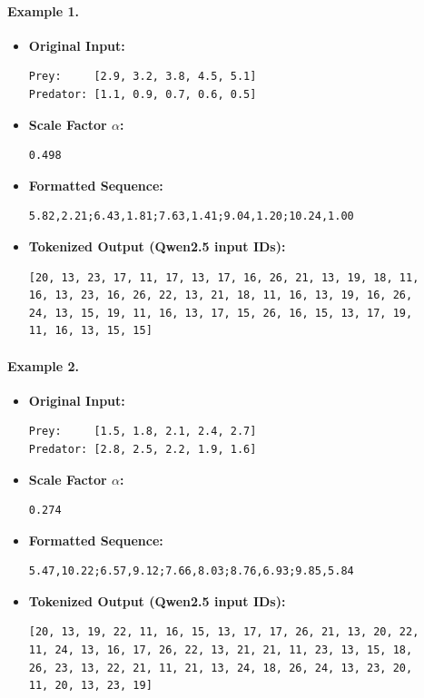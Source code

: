 \documentclass[a4paper,12pt]{article}
\begin{document}
\paragraph{Example 1.}
\begin{itemize}
  \item \textbf{Original Input:}
  \begin{verbatim}
Prey:     [2.9, 3.2, 3.8, 4.5, 5.1]
Predator: [1.1, 0.9, 0.7, 0.6, 0.5]
  \end{verbatim}

  \item \textbf{Scale Factor $\alpha$:}
  \begin{verbatim}
0.498
  \end{verbatim}


  \item \textbf{Formatted Sequence:}
  \begin{verbatim}
5.82,2.21;6.43,1.81;7.63,1.41;9.04,1.20;10.24,1.00
  \end{verbatim}

  \item \textbf{Tokenized Output (Qwen2.5 input IDs):}
  \begin{verbatim}
[20, 13, 23, 17, 11, 17, 13, 17, 16, 26, 21, 13, 19, 18, 11,
16, 13, 23, 16, 26, 22, 13, 21, 18, 11, 16, 13, 19, 16, 26,
24, 13, 15, 19, 11, 16, 13, 17, 15, 26, 16, 15, 13, 17, 19,
11, 16, 13, 15, 15]
  \end{verbatim}
\end{itemize}

\paragraph{Example 2.}
\begin{itemize}
  \item \textbf{Original Input:}
  \begin{verbatim}
Prey:     [1.5, 1.8, 2.1, 2.4, 2.7]
Predator: [2.8, 2.5, 2.2, 1.9, 1.6]
  \end{verbatim}

  \item \textbf{Scale Factor $\alpha$:}
  \begin{verbatim}
0.274
  \end{verbatim}


  \item \textbf{Formatted Sequence:}
  \begin{verbatim}
5.47,10.22;6.57,9.12;7.66,8.03;8.76,6.93;9.85,5.84
  \end{verbatim}

  \item \textbf{Tokenized Output (Qwen2.5 input IDs):}
  \begin{verbatim}
[20, 13, 19, 22, 11, 16, 15, 13, 17, 17, 26, 21, 13, 20, 22,
11, 24, 13, 16, 17, 26, 22, 13, 21, 21, 11, 23, 13, 15, 18,
26, 23, 13, 22, 21, 11, 21, 13, 24, 18, 26, 24, 13, 23, 20,
11, 20, 13, 23, 19]
  \end{verbatim}
\end{itemize}
\end{document}
